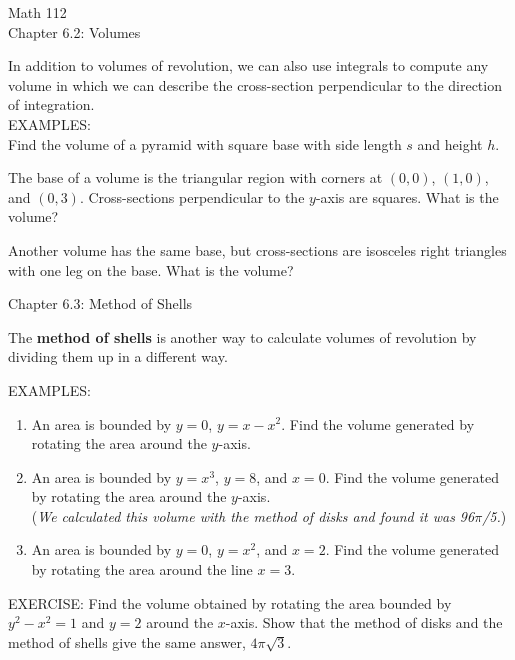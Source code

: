 \documentclass[11pt]{article}
\begin{document}
\begin{center}
\Large
\rm{Math 112}
\\
\rm{Chapter 6.2:  Volumes}
\\
\end{center}
\vspace{0.2in}

In addition to volumes of revolution, we can also use integrals to compute any volume in which we can describe the cross-section perpendicular to the direction of integration.\\

EXAMPLES:\\

Find the volume of a pyramid with square base with side length $s$ and height $h$.


\vspace{2.5in}

The base of a volume is the triangular region with corners at $(0,0)$, $(1,0)$, and $(0,3)$.  Cross-sections perpendicular to the $y$-axis
are squares.  What is the volume?

\vspace{2.8in}

Another volume has the same base, but cross-sections are isosceles right triangles with one leg on the base.  What is the volume?


\pagebreak

\begin{center}
\Large
\rm{Chapter 6.3:  Method of Shells}
\\
\end{center}

The {\bf method of shells} is another way to calculate volumes of revolution by dividing them up in a different way.


\vspace{4in}


EXAMPLES:\\

\begin{enumerate}
  \item{An area is bounded by $y=0$, $y=x-x^2$.  Find the volume generated by rotating the area around the $y$-axis.}


  \pagebreak

\item{An area is bounded by $y=x^3$, $y=8$, and $x=0$.  Find the volume generated by rotating the area around the $y$-axis.\\
  (\emph{We calculated this volume with the method of disks and found it was 96$\pi$/5.}) }  

  \vspace{3.5in}

  \item{An area is bounded by $y=0$, $y=x^2$, and $x=2$.  Find the volume generated by rotating the area around the line $x=3$.}

    \vspace{3.5in}
\end{enumerate}
EXERCISE:  Find the volume obtained by rotating the area bounded by $y^2-x^2=1$ and $y=2$ around the $x$-axis.  Show that
the method of disks and the method of shells give the same answer, $4\pi\sqrt{3}$.
\end{document}
